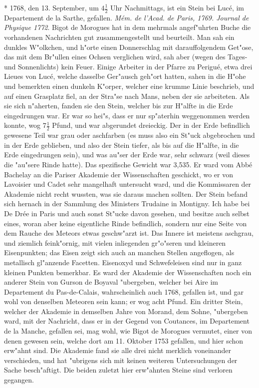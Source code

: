 \documentclass[a4paper, 11pt, oneside, polutonikogreek, german]{article}
\begin{document}
* 1768, den 13. September, um $\mathfrak{4\frac{1}{2}}$ Uhr Nachmittags, ist ein Stein bei Lucé, im Departement de la Sarthe, gefallen. \emph{Mém. de l'Acad. de Paris, 1769. Journal de Physique 1772}. Bigot de Morogues hat in dem mehrmals angef"uhrten Buche die vorhandenen Nachrichten gut zusammengestellt und beurteilt. Man sah ein dunkles W"olkchen, und h"orte einen Donnerschlag mit darauffolgendem Get"ose, das mit dem Br"ullen eines Ochsen verglichen wird, sah aber (wegen des Tages- und Sonnenlichts) kein Feuer. Einige Arbeiter in der Pfarre zu Perigué, etwa drei Lieues von Lucé, welche dasselbe Ger"ausch geh"ort hatten, sahen in die H"ohe und bemerkten einen dunkeln K"orper, welcher eine krumme Linie beschrieb, und auf einen Grasplatz fiel, an der Stra"se nach Mans, neben der sie arbeiteten. Als sie sich n"aherten, fanden sie den Stein, welcher bis zur H"alfte in die Erde eingedrungen war. Er war so hei"s, dass er nur sp"aterhin weggenommen werden konnte, wog $\mathfrak{7\frac{1}{2}}$ Pfund, und war abgerundet dreieckig. Der in der Erde befindlich gewesene Teil war grau oder aschfarben (es muss also ein St"uck abgebrochen und in der Erde geblieben, und also der Stein tiefer, als bis auf die H"alfte, in die Erde eingedrungen sein), und was au"ser der Erde war, sehr schwarz (weil dieses die "au"sere Rinde hatte). Das spezifische Gewicht war 3,535. Er ward vom Abbé Bachelay an die Pariser Akademie der Wissenschaften geschickt, wo er von Lavoisier und Cadet sehr mangelhaft untersucht ward, und die Kommissaren der Akademie nicht recht wussten, was sie daraus machen sollten. Der Stein befand sich hernach in der Sammlung des Ministers Trudaine in Montigny. Ich habe bei De Drée in Paris und auch sonst St"ucke davon gesehen, und besitze auch selbst eines, woran aber keine eigentliche Rinde befindlich, sondern nur eine Seite von dem Rauche des Meteors etwas geschw"arzt ist. Das Innere ist meistens aschgrau, und ziemlich feink"ornig, mit vielen inliegenden gr"o"seren und kleineren Eisenpunkten; das Eisen zeigt sich auch an manchen Stellen angeflogen, als metallisch gl"anzende Facetten. Eisenoxyd und Schwefeleisen sind nur in ganz kleinen Punkten bemerkbar. Es ward der Akademie der Wissenschaften noch ein anderer Stein von Gurson de Boyaval "ubergeben, welcher bei Aire im Departement du Pas-de-Calais, wahrscheinlich auch 1768, gefallen ist, und gar wohl von denselben Meteoren sein kann; er wog acht Pfund. Ein dritter Stein, welcher der Akademie in demselben Jahre von Morand, dem Sohne, "ubergeben ward, mit der Nachricht, dass er in der Gegend von Coutances, im Departement de la Manche, gefallen sei, mag wohl, wie Bigot de Morogues vermutet, einer von denen gewesen sein, welche dort am 11. Oktober 1753 gefallen, und hier schon erw"ahnt sind. Die Akademie fand sie alle drei nicht merklich voneinander verschieden, und hat "ubrigens sich mit keinen weiteren Untersuchungen der Sache besch"aftigt. Die beiden zuletzt hier erw"ahnten Steine sind verloren gegangen.
\end{document}

